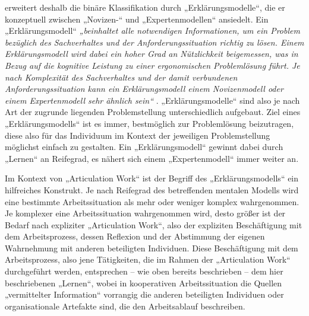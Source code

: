 \citet{Ifenthaler06} erweitert deshalb die binäre Klassifikation durch „Erklärungsmodelle“, die er konzeptuell zwischen „Novizen-“ und „Expertenmodellen“ ansiedelt. Ein „Erklärungsmodell“ \emph{„beinhaltet alle notwendigen Informationen, um ein Problem bezüglich des Sachverhaltes und der Anforderungssituation richtig zu lösen. Einem Erklärungsmodell wird dabei ein hoher Grad an Nützlichkeit beigemessen, was in Bezug auf die kognitive Leistung zu einer ergonomischen Problemlösung führt. Je nach Komplexität des Sachverhaltes und der damit verbundenen Anforderungssituation kann ein Erklärungsmodell einem Novizenmodell oder einem Expertenmodell sehr ähnlich sein“} \citep[][S. 21]{Ifenthaler06}. „Erklärungsmodelle“ sind also je nach Art der zugrunde liegenden Problemstellung unterschiedlich aufgebaut. Ziel eines „Erklärungsmodells“ ist es immer, bestmöglich zur Problemlösung beizutragen, diese also für das Individuum im Kontext der jeweiligen Problemstellung möglichst einfach zu gestalten. Ein „Erklärungsmodell“ gewinnt dabei durch „Lernen“ an Reifegrad, es nähert sich einem „Expertenmodell“ immer weiter an.

Im Kontext von „Articulation Work“ ist der Begriff des „Erklärungsmodells“ ein hilfreiches Konstrukt. Je nach Reifegrad des betreffenden mentalen Modells wird eine bestimmte Arbeitssituation als mehr oder weniger komplex wahrgenommen. Je komplexer eine Arbeitssituation wahrgenommen wird, desto größer ist der Bedarf nach expliziter „Articulation Work“, also der expliziten Beschäftigung mit dem Arbeitsprozess, dessen Reflexion und der Abstimmung der eigenen Wahrnehmung mit anderen beteiligten Individuen. Diese Beschäftigung mit dem Arbeitsprozess, also jene Tätigkeiten, die im Rahmen der „Articulation Work“ durchgeführt werden, entsprechen -- wie oben bereits beschrieben -- dem hier beschriebenen „Lernen“, wobei in kooperativen Arbeitssituation die Quellen „vermittelter Information“ vorrangig die anderen beteiligten Individuen oder organisationale Artefakte sind, die den Arbeitsablauf beschreiben. 

